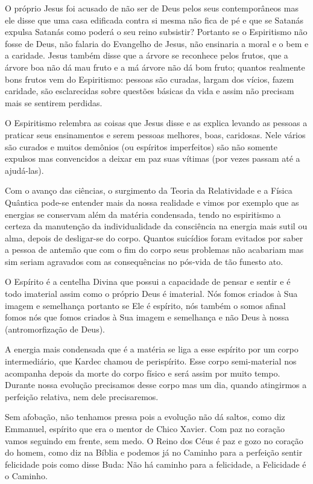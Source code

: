 \emdash{}O próprio Jesus foi acusado de não ser de Deus pelos seus contemporâneos mas ele disse que uma casa edificada contra si mesma não fica de pé e que se Satanás expulsa Satanás como poderá o seu reino subsistir? Portanto se o Espiritismo não fosse de Deus, não falaria do Evangelho de Jesus, não ensinaria a moral e o bem e a caridade. Jesus também disse que a árvore se reconhece pelos frutos, que a árvore boa não dá mau fruto e a má árvore não dá bom fruto; quantos realmente bons frutos vem do Espiritismo: pessoas são curadas, largam dos vícios, fazem caridade, são esclarecidas sobre questões básicas da vida e assim não precisam mais se sentirem perdidas. 


O Espiritismo relembra as coisas que Jesus disse e as explica levando as pessoas a praticar seus ensinamentos e serem pessoas melhores, boas, caridosas. Nele vários são curados e muitos demônios (ou espíritos imperfeitos) são não somente expulsos mas convencidos a deixar em paz suas vítimas (por vezes passam até a ajudá-las).

\emdash{}Com o avanço das ciências, o surgimento da Teoria da Relatividade e a Física Quântica pode-se entender mais da nossa realidade e vimos por exemplo que as energias se conservam além da matéria condensada, tendo no espiritismo a certeza da manutenção da individualidade da consciência na energia mais sutil ou alma, depois de desligar-se do corpo. Quantos suicídios foram evitados por saber a pessoa de antemão que com o fim do corpo seus problemas não acabariam mas sim seriam agravados com as consequências no pós-vida de tão funesto ato.

\emdash{}O Espírito é a centelha Divina que possui a capacidade de pensar e sentir e é todo imaterial assim como o próprio Deus é imaterial. Nós fomos criados à Sua imagem e semelhança portanto se Ele é espírito, nós também o somos afinal fomos nós que fomos criados à Sua imagem e semelhança e não Deus à nossa (antromorfização de Deus).

\emdash{}A energia mais condensada que é a matéria se liga a esse espírito por um corpo intermediário, que Kardec chamou de perispírito. Esse corpo semi-material nos acompanha depois da morte do corpo físico e será assim por muito tempo. Durante nossa evolução precisamos desse corpo mas um dia, quando atingirmos a perfeição relativa, nem dele precisaremos.

\emdash{}Sem afobação, não tenhamos pressa pois a evolução não dá saltos, como diz Emmanuel, espírito que era o mentor de Chico Xavier. Com paz no coração vamos seguindo em frente, sem medo. O Reino dos Céus é paz e gozo no coração do homem, como diz na Bíblia e podemos já no Caminho para a perfeição sentir felicidade pois como disse Buda: Não há caminho para a felicidade, a Felicidade é o Caminho.